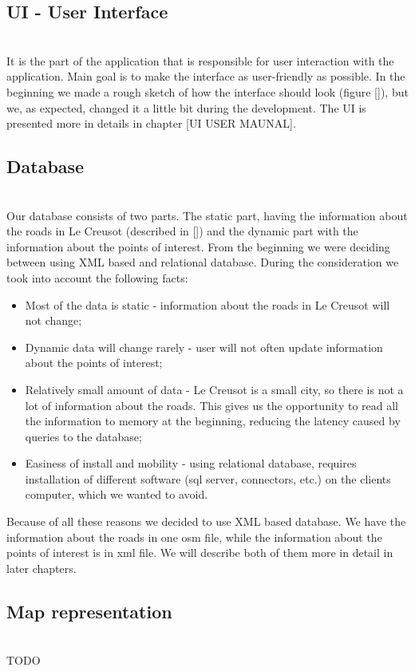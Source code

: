 \documentclass[reqno,openany,12pt]{amsbook}
\theoremstyle{definition}
\theoremstyle{remark}
\begin{document}
\subsection{UI - User Interface}\hspace*{\fill} \\
It is the part of the application that is responsible for user interaction with the application. Main goal is to make the interface as user-friendly as possible. In the beginning we made a rough sketch of how the interface should look (figure []), but we, as expected, changed it a little bit during the development. The UI is presented more in details in chapter [UI USER MAUNAL].
\subsection{Database}\hspace*{\fill} \\
Our database consists of two parts. The static part, having the information about the roads in Le Creusot (described in []) and the dynamic part with the information about the points of interest. From the beginning we were deciding between using XML based and relational database. During the consideration we took into account the following facts:
\begin{itemize}
\item Most of the data is static - information about the roads in Le Creusot will not change;
\item Dynamic data will change rarely - user will not often update information about the points of interest;
\item Relatively small amount of data - Le Creusot is a small city, so there is not a lot of information about the roads. This gives us the opportunity to read all the information to memory at the beginning, reducing the latency caused by queries to the database;
\item Easiness of install and mobility -  using relational database, requires installation of different software (sql server, connectors, etc.) on the clients computer, which we wanted to avoid. 
\end{itemize}  
Because of all these reasons we decided to use XML based database. We have the information about the roads in one osm file, while the information about the points of interest is in xml file. We will describe both of them more  in detail in later chapters.
\subsection{Map representation}\hspace*{\fill} \\
TODO
\end{document}
